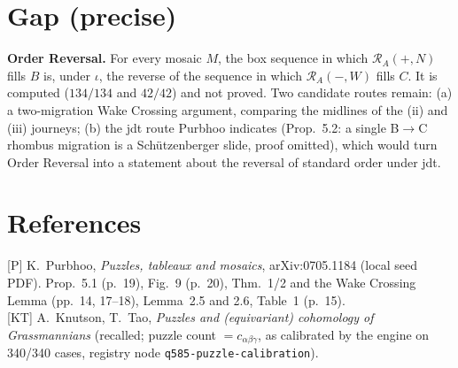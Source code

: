 \documentclass[11pt]{article}
\theoremstyle{definition}
\begin{document}
\section{Gap (precise)}
\textbf{Order Reversal.} For every mosaic $M$, the box sequence in which $\mathcal R_A(+,N)$ fills $B$ is, under $\iota$, the
reverse of the sequence in which $\mathcal R_A(-,W)$ fills $C$. It is computed ($134/134$ and $42/42$) and not proved. Two
candidate routes remain:
(a) a two-migration Wake Crossing argument, comparing the midlines of the (ii) and (iii) journeys;
(b) the jdt route Purbhoo indicates (Prop.~5.2: a single B$\to$C rhombus migration is a Sch\"utzenberger slide, proof omitted),
which would turn Order Reversal into a statement about the reversal of standard order under jdt.

\section*{References}
{[P]} K.~Purbhoo, \emph{Puzzles, tableaux and mosaics}, arXiv:0705.1184 (local seed PDF). Prop.~5.1 (p.~19), Fig.~9 (p.~20),
Thm.~1/2 and the Wake Crossing Lemma (pp.~14, 17--18), Lemma~2.5 and 2.6, Table~1 (p.~15).\\
{[KT]} A.~Knutson, T.~Tao, \emph{Puzzles and (equivariant) cohomology of Grassmannians} (recalled; puzzle count
$=c_{\alpha\beta\gamma}$, as calibrated by the engine on 340/340 cases, registry node \texttt{q585-puzzle-calibration}).
\end{document}
